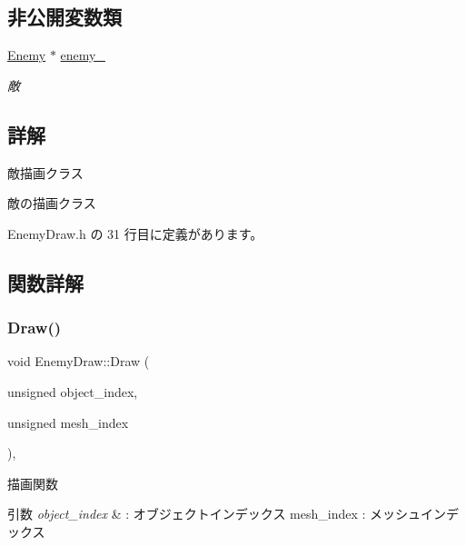 \subsection*{非公開変数類}
\begin{DoxyCompactItemize}
\item 
\mbox{\hyperlink{class_enemy}{Enemy}} $\ast$ \mbox{\hyperlink{class_enemy_draw_a95b8a7f07e810d1347f1704669c8f790}{enemy\+\_\+}}
\begin{DoxyCompactList}\small\item\em 敵 \end{DoxyCompactList}\end{DoxyCompactItemize}


\subsection{詳解}
敵描画クラス 

敵の描画クラス 

 Enemy\+Draw.\+h の 31 行目に定義があります。



\subsection{関数詳解}
\mbox{\label{class_enemy_draw_a20a23c1c5fd5e510d15e8ca27aabd821}} 
\subsubsection{\texorpdfstring{Draw()}{Draw()}}
{\footnotesize\ttfamily void Enemy\+Draw\+::\+Draw (\begin{DoxyParamCaption}\item[{unsigned}]{object\+\_\+index,  }\item[{unsigned}]{mesh\+\_\+index }\end{DoxyParamCaption})\hspace{0.3cm}{\ttfamily [override]}, {\ttfamily [virtual]}}



描画関数 


\begin{DoxyParams}{引数}
{\em object\+\_\+index} & \+: オブジェクトインデックス mesh\+\_\+index \+: メッシュインデックス \\
\hline
\end{DoxyParams}


